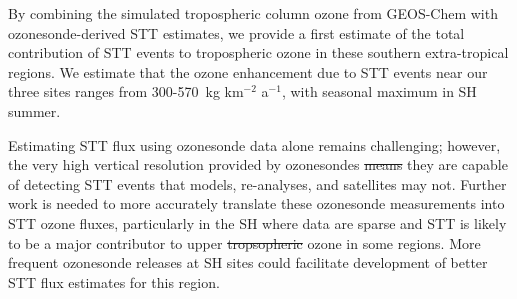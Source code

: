 \documentclass[acp, manuscript]{copernicus} %
\providecommand{\DIFadd}[1]{{\protect\color{blue}\uwave{#1}}} %
\providecommand{\DIFdel}[1]{{\protect\color{red}\sout{#1}}}                      %
\providecommand{\DIFaddbegin}{} %
\providecommand{\DIFaddend}{} %
\providecommand{\DIFdelbegin}{} %
\providecommand{\DIFdelend}{} %
\begin{document}
By combining the simulated tropospheric column ozone from GEOS-Chem with ozonesonde-derived STT estimates, we provide a first estimate of the total contribution of STT events to tropospheric ozone in these southern extra-tropical regions.
We estimate that the ozone enhancement due to STT events near our three sites ranges from 300-570~kg km$^{-2}$ a$^{-1}$, with seasonal maximum in SH summer.

Estimating STT flux using ozonesonde data alone remains challenging; however, the very high vertical resolution provided by ozonesondes \DIFdelbegin \DIFdel{means }\DIFdelend \DIFaddbegin \DIFadd{suggests  }\DIFaddend they are capable of detecting STT events that models, re-analyses, and satellites may not. 
Further work is needed to more accurately translate these ozonesonde measurements into STT ozone fluxes, particularly in the SH where data are sparse and STT is likely to be a major contributor to upper \DIFdelbegin \DIFdel{tropsopheric }\DIFdelend \DIFaddbegin \DIFadd{tropospheric }\DIFaddend ozone in some regions.
More frequent ozonesonde releases at SH sites could facilitate development of better STT flux estimates for this region.

\appendix

\appendixfigures  %
\appendixtables   %

\end{document}
